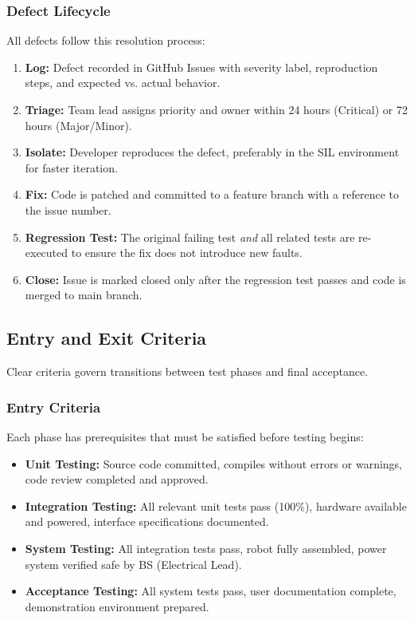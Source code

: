 \subsubsection{Defect Lifecycle}

All defects follow this resolution process:

\begin{enumerate}
    \item \textbf{Log:} Defect recorded in GitHub Issues with severity label, reproduction steps, and expected vs. actual behavior.
    \item \textbf{Triage:} Team lead assigns priority and owner within 24 hours (Critical) or 72 hours (Major/Minor).
    \item \textbf{Isolate:} Developer reproduces the defect, preferably in the SIL environment for faster iteration.
    \item \textbf{Fix:} Code is patched and committed to a feature branch with a reference to the issue number.
    \item \textbf{Regression Test:} The original failing test \textit{and} all related tests are re-executed to ensure the fix does not introduce new faults.
    \item \textbf{Close:} Issue is marked closed only after the regression test passes and code is merged to main branch.
\end{enumerate}

\subsection{Entry and Exit Criteria}

Clear criteria govern transitions between test phases and final acceptance.

\subsubsection{Entry Criteria}

Each phase has prerequisites that must be satisfied before testing begins:

\begin{itemize}
    \item \textbf{Unit Testing:} Source code committed, compiles without errors or warnings, code review completed and approved.
    \item \textbf{Integration Testing:} All relevant unit tests pass (100\%), hardware available and powered, interface specifications documented.
    \item \textbf{System Testing:} All integration tests pass, robot fully assembled, power system verified safe by BS (Electrical Lead).
    \item \textbf{Acceptance Testing:} All system tests pass, user documentation complete, demonstration environment prepared.
\end{itemize}


